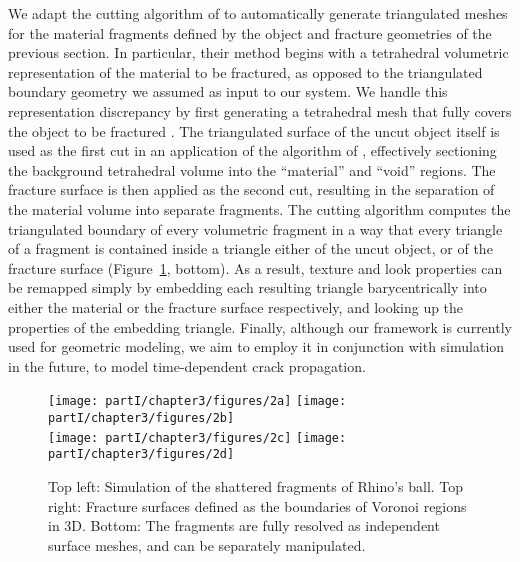 We adapt the cutting algorithm of \cite{Sifakis07} to automatically
generate triangulated meshes for the material fragments defined
by the object and fracture geometries of the previous section.
In particular, their method begins with a tetrahedral volumetric representation
of the material to be fractured, as opposed to the triangulated
boundary geometry we assumed as input to our system. We
handle this representation discrepancy by first generating a tetrahedral
mesh that fully covers the object to be fractured . The triangulated
surface of the uncut object itself is used as the first cut in an
application of the algorithm of \cite{Sifakis07}, effectively sectioning
the background tetrahedral volume into the ``material'' and
``void'' regions. The fracture surface is then applied as the second
cut, resulting in the separation of the material volume into separate
fragments. The cutting algorithm computes the triangulated boundary
of every volumetric fragment in a way that every triangle of a
fragment is contained inside a triangle either of the uncut object,
or of the fracture surface (Figure~\ref{fig:chap3.2}, bottom). As a result, texture and
look properties can be remapped simply by embedding each resulting
triangle barycentrically into either the material or the fracture
surface respectively, and looking up the properties of the embedding
triangle. Finally, although our framework is currently used for
geometric modeling, we aim to employ it in conjunction with simulation
in the future, to model time-dependent crack propagation.

\setlength{\figurewidth}{0.49\textwidth}
\begin{figure}[htbp]
\centering
\texttt{[image: partI/chapter3/figures/2a]}
\texttt{[image: partI/chapter3/figures/2b]} \\
\texttt{[image: partI/chapter3/figures/2c]}
\texttt{[image: partI/chapter3/figures/2d]}
\caption{Top left: Simulation of the shattered fragments of Rhino's ball. Top right: Fracture surfaces defined as the boundaries of Voronoi regions in 3D. Bottom: The fragments are fully resolved as independent surface meshes, and can be separately manipulated.}
\label{fig:chap3.2}
\end{figure}
